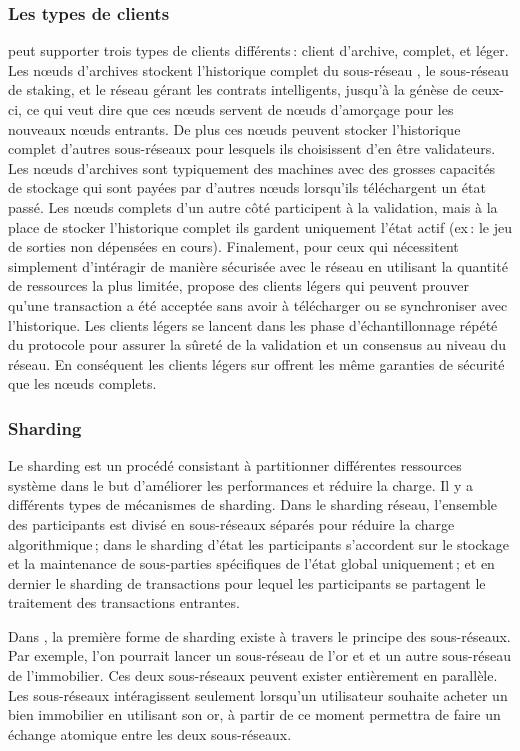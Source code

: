 \documentclass[runningheads,francais,a4paper]{llncs}
\begin{document}
\subsubsection{Les types de clients}
\AVAPlatformName{} peut supporter trois types de clients différents\,: client d'archive, complet, et léger. Les nœuds
d'archives stockent l'historique complet du sous-réseau \AVATokenName{}, le sous-réseau de staking, et le réseau gérant
les contrats intelligents, jusqu'à la génèse de ceux-ci, ce qui veut dire que ces nœuds servent de nœuds d'amorçage
pour les nouveaux nœuds entrants. De plus ces nœuds peuvent stocker l'historique complet d'autres sous-réseaux pour
lesquels ils choisissent d'en être validateurs. Les nœuds d'archives sont typiquement des machines avec des grosses
capacités de stockage qui sont payées par d'autres nœuds lorsqu'ils téléchargent un état passé. Les nœuds complets
d'un autre côté participent à la validation, mais à la place de stocker l'historique complet ils gardent uniquement
l'état actif (ex\,: le jeu de sorties non dépensées en cours). Finalement, pour ceux qui nécessitent simplement
d'intéragir de manière sécurisée avec le réseau en utilisant la quantité de ressources la plus limitée,
\AVAPlatformName{} propose des clients légers qui peuvent prouver qu'une transaction a été acceptée sans avoir à
télécharger ou se synchroniser avec l'historique. Les clients légers se lancent dans les phase d'échantillonnage répété
du protocole pour assurer la sûreté de la validation et un consensus au niveau du réseau. En conséquent les clients
légers sur \AVAPlatformName{} offrent les même garanties de sécurité que les nœuds complets.

\subsubsection{Sharding}
Le sharding est un procédé consistant à partitionner différentes ressources système dans le but d'améliorer les
performances et réduire la charge. Il y a différents types de mécanismes de sharding. Dans le sharding réseau,
l'ensemble des participants est divisé en sous-réseaux séparés pour réduire la charge algorithmique\,; dans le sharding
d'état les participants s'accordent sur le stockage et la maintenance de sous-parties spécifiques de l'état global
uniquement\,; et en dernier le sharding de transactions pour lequel les participants se partagent le traitement des
transactions entrantes.

Dans \AVAPlatformNameFirstRelease{}, la première forme de sharding existe à travers le principe des sous-réseaux. Par
exemple, l'on pourrait lancer un sous-réseau de l'or et et un autre sous-réseau de l'immobilier. Ces deux sous-réseaux
peuvent exister entièrement en parallèle. Les sous-réseaux intéragissent seulement lorsqu'un utilisateur souhaite
acheter un bien immobilier en utilisant son or, à partir de ce moment \AVAPlatformName{} permettra de faire un
échange atomique entre les deux sous-réseaux.
\end{document}
